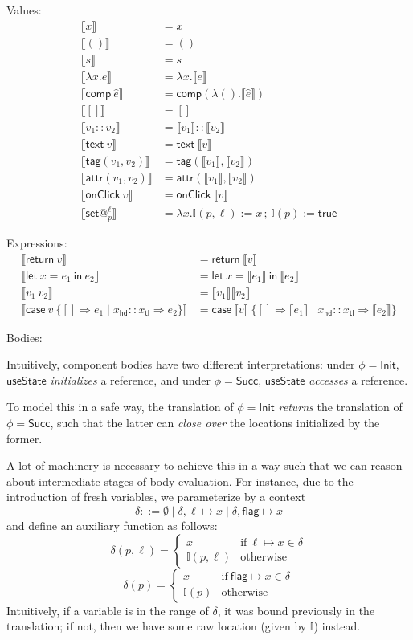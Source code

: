 \documentclass{article}
\makeatletter
\newcommand{\mf}[1]{\mathsf{#1}}
\newcommand{\semi}{\,;\,}
\newcommand{\llrr}[1]{\llbracket #1 \rrbracket}
\newcommand{\vtxt}[1]{\mf{text}\ #1}
\newcommand{\vtag}[2]{\mf{tag}(#1, #2)}
\newcommand{\vattr}[2]{\mf{attr}(#1, #2)}
\newcommand{\vclick}[1]{\mf{onClick}\ #1}
\newcommand{\vset}[2]{\mf{set}@^{#1}_{#2}}
\newcommand{\I}{\mathbb{I}}
\newcommand{\elet}[3]{\mf{let}\ #1 = #2\ \mf{in}\ #3}
\newcommand{\eret}[1]{\mf{return}\ #1}
\newcommand{\ecase}[5]{\mf{case}\ #1\ \{#2 \Rightarrow #3 \mid #4 \Rightarrow #5\}}
\newcommand{\eset}[2]{#1 := #2}
\makeatother
\begin{document}
Values:
\begin{align*}
\llrr{x} &= x\\
\llrr{()} &= ()\\
\llrr{s} &= s\\
\llrr{\lambda x.e} &= \lambda x.\llrr{e}\\
\llrr{\mf{comp}\ \hat{e}} &= \mf{comp}(
  \lambda ().\llrr{\hat{e}}
)\\
\llrr{[]} &= []\\
\llrr{v_1 :: v_2} &= \llrr{v_1} :: \llrr{v_2}\\
\llrr{\vtxt{v}} &= \vtxt{\llrr{v}}\\
\llrr{\vtag{v_1}{v_2}} &= \vtag{\llrr{v_1}}{\llrr{v_2}}\\
\llrr{\vattr{v_1}{v_2}} &= \vattr{\llrr{v_1}}{\llrr{v_2}}\\
\llrr{\vclick{v}} &= \vclick{\llrr{v}}\\
\llrr{\vset{\ell}{p}}
&= \lambda x. \eset{\I(p, \ell)}{x}
\semi \eset{\I(p)}{\mf{true}}
\end{align*}

Expressions:
\begin{align*}
\llrr{\eret{v}} &= \eret{\llrr{v}}\\
\llrr{\elet{x}{e_1}{e_2}} &= \elet{x}{\llrr{e_1}}{\llrr{e_2}}\\
\llrr{v_1\ v_2} &= \llrr{v_1}\llrr{v_2}\\
\llrr{\ecase{v}{[]}{e_1}{x_\mf{hd} :: x_\mf{tl}}{e_2}}
&= \ecase{\llrr{v}}{[]}{\llrr{e_1}}{x_\mf{hd} :: x_\mf{tl}}{\llrr{e_2}}
\end{align*}

Bodies:

Intuitively, component bodies have two different interpretations:
under $\phi=\mf{Init}$, $\mf{useState}$ \emph{initializes}
a reference, and under $\phi=\mf{Succ}$, $\mf{useState}$
\emph{accesses} a reference.

To model this in a safe way, the translation of $\phi=\mf{Init}$
\emph{returns} the translation of $\phi=\mf{Succ}$,
such that the latter can \emph{close over} the locations
initialized by the former.

A lot of machinery is necessary to achieve this in a way
such that we can reason about intermediate stages of body evaluation.
For instance, due to the introduction of fresh variables,
we parameterize by a context
$$\delta ::= \emptyset \mid \delta, \ell \mapsto x 
\mid \delta, \mf{flag} \mapsto x$$
and define an auxiliary function as follows:
\[\delta(p, \ell) = \begin{cases}
  x & \text{if}\ \ell \mapsto x \in \delta\\
  \I(p, \ell) & \text{otherwise}
\end{cases}\]
\[\delta(p) = \begin{cases}
  x & \text{if}\ \mf{flag} \mapsto x \in \delta\\
  \I(p) & \text{otherwise}
\end{cases}\]
Intuitively, if a variable is in the range of $\delta$,
it was bound previously in the translation;
if not, then we have some raw location (given by $\I$)
instead.
\end{document}
